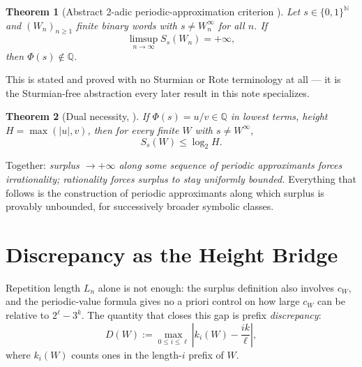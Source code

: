 \documentclass[11pt]{article}
\newtheorem{theorem}{Theorem}[section]
\newcommand{\Q}{\mathbb{Q}}
\newcommand{\N}{\mathbb{N}}
\begin{document}
\begin{theorem}[Abstract 2-adic periodic-approximation criterion \cite{Phase2Abstract}]
\label{thm:abstract}
Let $s\in\{0,1\}^\N$ and $(W_n)_{n\ge1}$ finite binary words with $s\ne W_n^\infty$ for all $n$. If
\[
\limsup_{n\to\infty} S_s(W_n) = +\infty,
\]
then $\Phi(s)\notin\Q$.
\end{theorem}
This is stated and proved with no Sturmian or Rote terminology at all --- it is the Sturmian-free abstraction every later result in this note specializes.

\begin{theorem}[Dual necessity, \cite{Phase2Surplus}]
If $\Phi(s)=u/v\in\Q$ in lowest terms, height $H=\max(|u|,v)$, then for every finite $W$ with $s\ne W^\infty$,
\[
S_s(W) \le \log_2 H.
\]
\end{theorem}
Together: \emph{surplus $\to+\infty$ along some sequence of periodic approximants forces irrationality; rationality forces surplus to stay uniformly bounded.} Everything that follows is the construction of periodic approximants along which surplus is provably unbounded, for successively broader symbolic classes.

\section{Discrepancy as the Height Bridge}
\label{sec:discrepancy}

Repetition length $L_n$ alone is not enough: the surplus definition also involves $c_W$, and the periodic-value formula gives no a priori control on how large $c_W$ can be relative to $2^\ell-3^k$. The quantity that closes this gap is prefix \emph{discrepancy}:
\[
D(W) := \max_{0\le i\le \ell} \left| k_i(W) - \frac{ik}{\ell}\right|,
\]
where $k_i(W)$ counts ones in the length-$i$ prefix of $W$.
\end{document}
